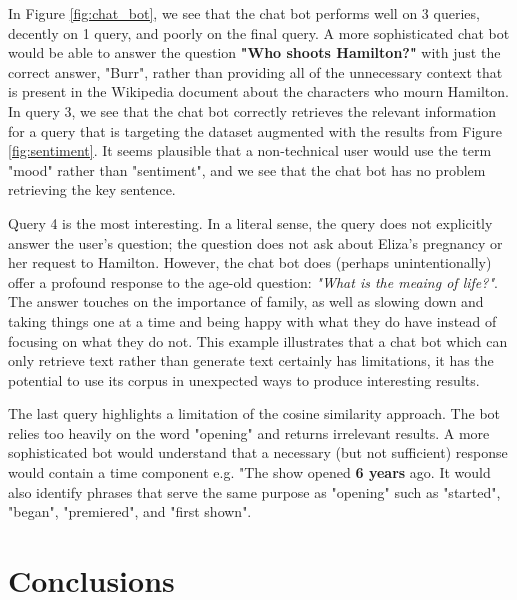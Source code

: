 \documentclass{article}
\begin{document}
In Figure \ref{fig:chat_bot}, we see that the chat bot performs well on 3 queries, decently on 1 query, and poorly on the final query. A more sophisticated chat bot would be able to answer the question \textbf{"Who shoots Hamilton?"} with just the correct answer, "Burr", rather than providing all of the unnecessary context that is present in the Wikipedia document about the characters who mourn Hamilton. In query 3, we see that the chat bot correctly retrieves the relevant information for a query that is targeting the dataset augmented with the results from Figure \ref{fig:sentiment}. It seems plausible that a non-technical user would use the term "mood" rather than "sentiment", and we see that the chat bot has no problem retrieving the key sentence. 

Query 4 is the most interesting. In a literal sense, the query does not explicitly answer the user's question; the question does not ask about Eliza's pregnancy or her request to Hamilton. However, the chat bot does (perhaps unintentionally) offer a profound response to the age-old question: \emph{"What is the meaing of life?"}. The answer touches on the importance of family, as well as slowing down and taking things one at a time and being happy with what they do have instead of focusing on what they do not. This example illustrates that a chat bot which can only retrieve text rather than generate text certainly has limitations, it has the potential to use its corpus in unexpected ways to produce interesting results.

The last query highlights a limitation of the cosine similarity approach. The bot relies too heavily on the word "opening" and returns irrelevant results. A more sophisticated bot would understand that a necessary (but not sufficient) response would contain a time component e.g. "The show opened \textbf{6 years} ago. It would also identify phrases that serve the same purpose as "opening" such as "started", "began", "premiered", and "first shown". 


\section{Conclusions}



\end{document}
